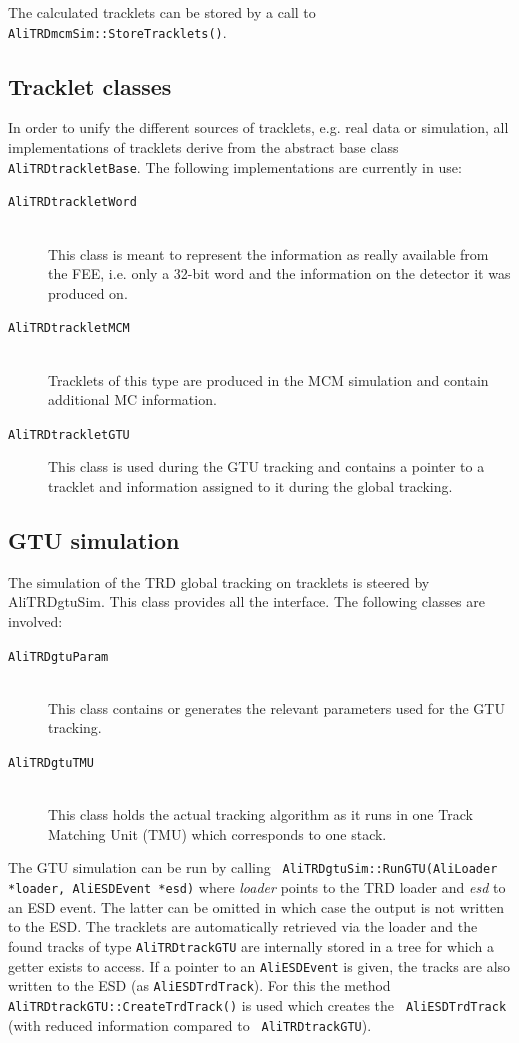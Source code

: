 \documentclass{alicetdr}
\begin{document}
The calculated tracklets can be stored by a call to {\tt AliTRDmcmSim::StoreTracklets()}.

\subsection{Tracklet classes}
In order to unify the different sources of tracklets, e.g. real data
or simulation, all implementations of tracklets derive from the
abstract base class {\tt AliTRDtrackletBase}. The following
implementations are currently in use:
\begin{description}
\item[{\tt AliTRDtrackletWord}] ~\\ This class is meant to represent the
  information as really available from the FEE, i.e. only a 32-bit
  word and the information on the detector it was produced on.
\item[{\tt AliTRDtrackletMCM}] ~\\ Tracklets of this type are produced in
  the MCM simulation and contain additional MC information.
\item[{\tt AliTRDtrackletGTU}] This class is used during the GTU tracking
  and contains a pointer to a tracklet and information assigned to it
  during the global tracking.  
\end{description}

\subsection{GTU simulation}

The simulation of the TRD global tracking on tracklets is steered by
AliTRDgtuSim. This class provides all the interface. The following
classes are involved:
\begin{description}
\item[{\tt AliTRDgtuParam}] ~\\ This class contains or generates the relevant
  parameters used for the GTU tracking. 
\item[{\tt AliTRDgtuTMU}] ~\\ This class holds the actual tracking algorithm
  as it runs in one Track Matching Unit (TMU) which corresponds to one
  stack. 
\end{description}

The GTU simulation can be run by calling {\tt
  AliTRDgtuSim::RunGTU(AliLoader *loader, AliESDEvent *esd)} where
{\it loader} points to the TRD loader and {\it esd} to an ESD
event. The latter can be omitted in which case the output is not
written to the ESD. The tracklets are automatically retrieved via the
loader and the found tracks of type {\tt AliTRDtrackGTU} are
internally stored in a tree for which a getter exists to access. If a
pointer to an {\tt AliESDEvent} is given, the tracks are also written
to the ESD (as {\tt AliESDTrdTrack}). For this the method {\tt
  AliTRDtrackGTU::CreateTrdTrack()} is used which creates the {\tt
  AliESDTrdTrack} (with reduced information compared to {\tt
  AliTRDtrackGTU}).
\end{document}
